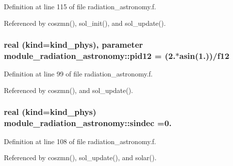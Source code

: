 Definition at line 115 of file radiation\+\_\+astronomy.\+f.



Referenced by coszmn(), sol\+\_\+init(), and sol\+\_\+update().

\subsubsection[{\texorpdfstring{pid12}{pid12}}]{\setlength{\rightskip}{0pt plus 5cm}real (kind=kind\+\_\+phys), parameter module\+\_\+radiation\+\_\+astronomy\+::pid12 = (2.$\ast$asin(1.))/{\bf f12}\hspace{0.3cm}{\ttfamily [private]}}\hypertarget{namespacemodule__radiation__astronomy_adbf9cdfc7b55d882f015a4bc4ef276ab}{}\label{namespacemodule__radiation__astronomy_adbf9cdfc7b55d882f015a4bc4ef276ab}


Definition at line 99 of file radiation\+\_\+astronomy.\+f.



Referenced by coszmn(), and sol\+\_\+update().

\subsubsection[{\texorpdfstring{sindec}{sindec}}]{\setlength{\rightskip}{0pt plus 5cm}real (kind=kind\+\_\+phys) module\+\_\+radiation\+\_\+astronomy\+::sindec =0.\hspace{0.3cm}{\ttfamily [private]}}\hypertarget{namespacemodule__radiation__astronomy_ae195d9c834e2789170f89c988d28b01e}{}\label{namespacemodule__radiation__astronomy_ae195d9c834e2789170f89c988d28b01e}


Definition at line 108 of file radiation\+\_\+astronomy.\+f.



Referenced by coszmn(), sol\+\_\+update(), and solar().

